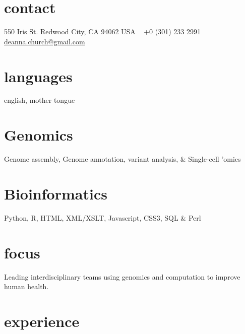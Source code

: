 \documentclass[]{dmc-cv} %
\begin{document}


\begin{aside} %
\section{contact}
550 Iris St.
Redwood City, CA 94062
USA
~
+0 (301) 233 2991
~
\href{mailto:deanna.church@gmail.com}{deanna.church@gmail.com}
\section{languages}
english, mother tongue
\section{Genomics}
Genome assembly,
Genome annotation,
variant analysis, \&
Single-cell 'omics
\section{Bioinformatics}
Python, R,
HTML, XML/XSLT, Javascript,
CSS3, SQL \& Perl
\end{aside}

\section{focus}
Leading interdisciplinary teams using genomics and computation to improve human health.


\section{experience}
\end{document}
